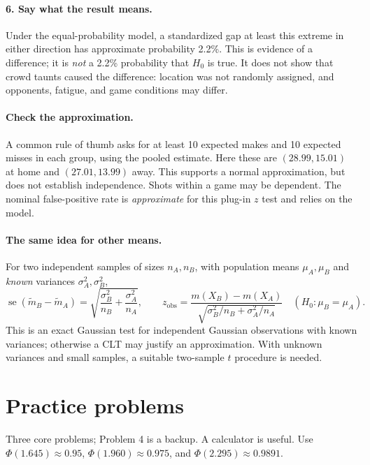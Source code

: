 \documentclass[11pt]{article}
\newcommand{\rv}[1]{\widetilde{#1}}
\newcommand{\se}{\operatorname{se}}
\begin{document}
\paragraph{6. Say what the result means.}
Under the equal-probability model, a standardized gap at least this extreme
in either direction has approximate probability 2.2\%. This is evidence of
a difference; it is \emph{not} a 2.2\% probability that $H_0$ is true.
It does not show that crowd taunts caused the difference: location was not
randomly assigned, and opponents, fatigue, and game conditions may differ.

\paragraph{Check the approximation.}
A common rule of thumb asks for at least 10 expected makes and 10 expected
misses in each group, using the pooled estimate. Here these are
$(28.99,15.01)$ at home and $(27.01,13.99)$ away. This supports a normal
approximation, but does not establish independence. Shots within a game may
be dependent. The nominal false-positive rate is \emph{approximate} for this
plug-in $z$ test and relies on the model.

\paragraph{The same idea for other means.}
For two independent samples of sizes $n_A,n_B$, with population means
$\mu_A,\mu_B$ and \emph{known} variances $\sigma_A^2,\sigma_B^2$,
\[
 \se(\rv m_B-\rv m_A)=\sqrt{\frac{\sigma_B^2}{n_B}+\frac{\sigma_A^2}{n_A}},
 \qquad z_{\mathrm{obs}}=
 \frac{m(X_B)-m(X_A)}{\sqrt{\sigma_B^2/n_B+\sigma_A^2/n_A}}
 \quad(H_0:\mu_B=\mu_A).
\]
This is an exact Gaussian test for independent Gaussian observations with
known variances; otherwise a CLT may justify an approximation. With unknown
variances and small samples, a suitable two-sample $t$ procedure is needed.

\newpage
\section*{Practice problems}
\noindent Three core problems; Problem 4 is a backup. A calculator is useful.
Use $\Phi(1.645)\approx0.95$, $\Phi(1.960)\approx0.975$, and
$\Phi(2.295)\approx0.9891$.
\end{document}
